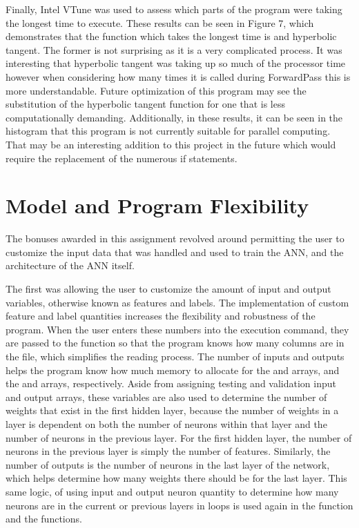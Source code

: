 \documentclass[12pt]{article}
\begin{document}
Finally, Intel VTune was used to assess which parts of the program were taking the longest time to execute. These results can be seen in Figure 7, which demonstrates that the function which takes the longest time is  and hyperbolic tangent. The former is not surprising as it is a very complicated process. It was interesting that hyperbolic tangent was taking up so much of the processor time however when considering how many times it is called during ForwardPass this is more understandable. Future optimization of this program may see the substitution of the hyperbolic tangent function for one that is less computationally demanding. Additionally, in these results, it can be seen in the histogram that this program is not currently suitable for parallel computing. That may be an interesting addition to this project in the future which would require the replacement of the numerous if statements.

\section{Model and Program Flexibility}

The bonuses awarded in this assignment revolved around permitting the user to customize the input data that was handled and used to train the ANN, and the architecture of the ANN itself. 

The first was allowing the user to customize the amount of input and output variables, otherwise known as features and labels. The implementation of custom feature and label quantities increases the flexibility and robustness of the program. When the user enters these numbers into the execution command, they are passed to the function  so that the program knows how many columns are in the file, which simplifies the reading process. The number of inputs and outputs helps the program know how much memory to allocate for the  and  arrays, and the  and  arrays, respectively. Aside from assigning testing and validation input and output arrays, these variables are also used to determine the number of weights that exist in the first hidden layer, because the number of weights in a layer is dependent on both the number of neurons within that layer and the number of neurons in the previous layer. For the first hidden layer, the number of neurons in the previous layer is simply the number of features. Similarly, the number of outputs is the number of neurons in the last layer of the network, which helps determine how many weights there should be for the last layer. This same logic, of using input and output neuron quantity to determine how many neurons are in the current or previous layers in  loops is used again in the  function and the  functions. 
\end{document}
